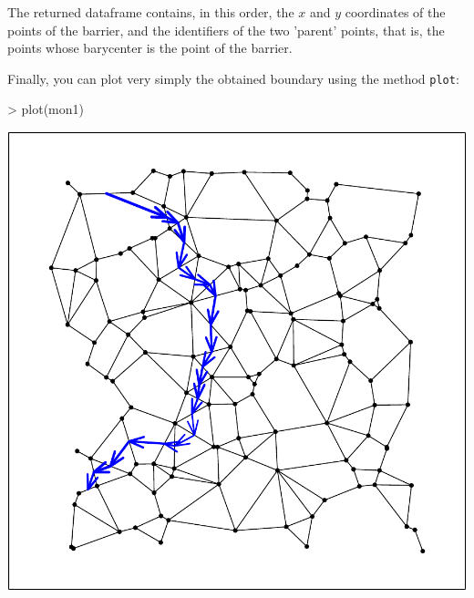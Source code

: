 \documentclass{article}
\begin{document}
\noindent The returned dataframe contains, in this order, the $x$ and
$y$ coordinates of the points of the barrier, and the identifiers of
the two 'parent' points, that is, the points whose barycenter is the
point of the barrier.

Finally, you can plot very simply the obtained boundary using the method \texttt{plot}:
\begin{Schunk}
\begin{Sinput}
> plot(mon1)
\end{Sinput}
\end{Schunk}
\includegraphics{figs/base-103}
\end{document}
